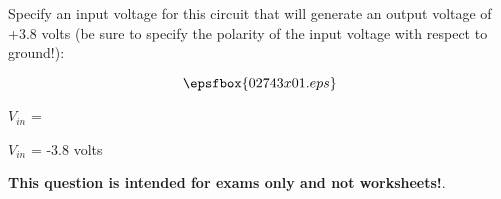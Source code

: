 

Specify an input voltage for this circuit that will generate an output voltage of +3.8 volts (be sure to specify the polarity of the input voltage with respect to ground!):

$$\epsfbox{02743x01.eps}$$

$V_{in}$ = 







$V_{in}$ = -3.8 volts







{\bf This question is intended for exams only and not worksheets!}.





